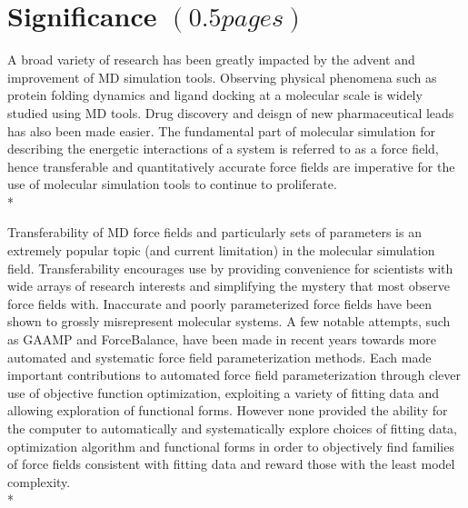 \documentclass[rmp,nofootinbib,superscriptaddress,12pt,tightenlines,notitlepage]{revtex4-1}
\begin{document}
\section{Significance $\left(0.5 pages\right)$}
A broad variety of research has been greatly impacted by the advent and improvement of MD simulation tools. Observing physical phenomena such as protein folding dynamics and ligand docking at a molecular scale is widely studied using MD tools.\cite{villin} Drug discovery and deisgn of new pharmaceutical leads has also been made easier.\cite{drug_discov} The fundamental part of molecular simulation for describing the energetic interactions of a system is referred to as a force field, hence transferable and quantitatively accurate force fields are imperative for the use of molecular simulation tools to continue to proliferate.\\*

Transferability of MD force fields and particularly sets of parameters is an extremely popular topic (and current limitation) in the molecular simulation field.\cite{transferability1,transferability2,transferability3,transferability4} Transferability encourages use by providing convenience for scientists with wide arrays of research interests and simplifying the mystery that most observe force fields with. Inaccurate and poorly parameterized force fields have been shown to grossly misrepresent molecular systems.\cite{ffcomp1,ffcomp2} A few notable attempts, such as GAAMP and ForceBalance, have been made in recent years towards more automated and systematic force field parameterization methods.\cite{GAAMP,FB1,FB2,FB3} Each made important contributions to automated force field parameterization through clever use of objective function optimization, exploiting a variety of fitting data and allowing exploration of functional forms. However none provided the ability for the computer to automatically and systematically explore choices of fitting data, optimization algorithm and functional forms in order to objectively find families of force fields consistent with fitting data and reward those with the least model complexity.\\*
\end{document}

